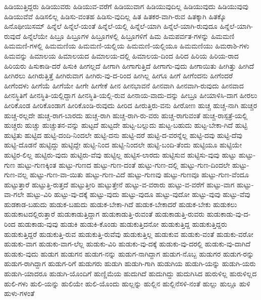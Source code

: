 {ಹಿಡಿಯುತ್ತಿದ್ದರು
ಹಿಡಿಯುವರು
ಹಿಡಿಯುವ-ವರೆಗೆ
ಹಿಡಿಯುವಾಗ
ಹಿಡಿಯುವುದಿಲ್ಲ
ಹಿಡಿಯುವುದು
ಹಿಡಿಯುವುವು
ಹಿಡಿಯುವೆವೆ
ಹಿಡಿಸಲಿಲ್ಲ
ಹಿಡಿಸು-ವಂತಹ
ಹಿಡಿಸು-ವುದಿಲ್ಲ
ಹಿತ
ಹಿತಕರ-ವಾಗಿ-ರುವ
ಹಿತಕ್ಕಾಗಿ
ಹಿತಕ್ಕೊ
ಹಿನೊಥೀಯಿಸಮ್
ಹಿನ್ನೆಲೆ
ಹಿನ್ನೆಲೆ-ಯಂತೆ
ಹಿನ್ನೆಲೆ-ಯಲ್ಲಿ
ಹಿನ್ನೆಲೆ-ಯಾಗಿ
ಹಿನ್ನೆಲೆ-ಯಾಗಿ-ರುವುದೂ
ಹಿನ್ನೆಲೆ-ಯಾಗಿ-ರುವುದೆ
ಹಿನ್ನೆಲೆಯೇ
ಹಿಬ್ರೂ
ಹಿಬ್ರೂಗಳ
ಹಿಬ್ರೂಗಳಲ್ಲಿ
ಹಿಬ್ರೂಗಳಿಗೆ
ಹಿಮ
ಹಿಮಪರ್ವತ-ಗಳನ್ನು
ಹಿಮಮಣಿ
ಹಿಮಮಣಿ-ಗಳಲ್ಲಿ
ಹಿಮಮಣಿಯ
ಹಿಮಮಣಿ-ಯಲ್ಲಿಯ
ಹಿಮಮಣಿ-ಯಲ್ಲಿಯೂ
ಹಿಮಮಣಿಯು
ಹಿಮರಾಶಿ-ಗಳು
ಹಿಮವನ್ನು
ಹಿಮಾಲಯ
ಹಿಮಾಲಯದ
ಹಿಮಾಲಯ-ದಲ್ಲಿ
ಹಿಮಾಲಯ-ದಿಂದ
ಹಿರಿದ
ಹಿರಿಯ
ಹಿರಿಯ-ರಾದ
ಹಿರಿಯರು
ಹಿಸುಕಾಡಿ-ದರೆ
ಹಿಸುಕಿ
ಹೀಗಲ್ಲದೆ
ಹೀಗಾಗಿ
ಹೀಗಾಗುತ್ತಿದೆ
ಹೀಗಾಗು-ವುದು
ಹೀಗಾಯಿತು
ಹೀಗಿತ್ತು
ಹೀಗಿದೆ
ಹೀಗಿರಲು
ಹೀಗಿರುತ್ತಿತ್ತೆ
ಹೀಗಿರುವಾಗ
ಹೀಗಿರು-ವು-ದ-ರಿಂದ
ಹೀಗಿಲ್ಲ
ಹೀಗೂ
ಹೀಗೆ
ಹೀಗೆಂದನು
ಹೀಗೆಂದರೆ
ಹೀಗೆಂದಳು
ಹೀಗೆಯೆ
ಹೀಗೆಯೇ
ಹೀಗೇ
ಹೀಗೇಕೆ
ಹೀನ
ಹೀನಭಾವನೆ
ಹೀನವಾಗಿ
ಹೀನವಾಗಿ-ರುವುದು
ಹೀನವಾದ
ಹೀನಸ್ಥಿತಿಗೆ
ಹೀನಸ್ಥಿತಿ-ಯಲ್ಲಿದ್ದಾಗ
ಹೀನಸ್ಥಿತಿ-ಯಲ್ಲಿ-ರುವ
ಹೀನಾಯ-ವಾದು-ದನ್ನು
ಹೀಬ್ರೂ
ಹೀಯಾಳಿಸಿ-ದಾಗ
ಹೀರಲು
ಹೀರಿಕೊಂಡ
ಹೀರಿಕೊಂಡಾಗ
ಹೀರಿಕೊಂಡಿ-ರುವುದು
ಹೀರಿದ
ಹೀರುತ್ತಿರು-ವನು
ಹೀರೋಣ
ಹುಚ್ಚ
ಹುಚ್ಚ-ನಾಗಿ
ಹುಚ್ಚರ
ಹುಚ್ಚ-ರಲ್ಲದೇ
ಹುಚ್ಚ-ರಾಗ-ಬಾರದು
ಹುಚ್ಚ-ರಾಗಿ
ಹುಚ್ಚ-ರಾಗಿ-ರು-ವರು
ಹುಚ್ಚ-ರಾಗುವಂತೆ
ಹುಚ್ಚ-ರಾಸ್ಪತ್ರೆ-ಯಲ್ಲಿ
ಹುಚ್ಚರು
ಹುಚ್ಚು
ಹುಚ್ಚುತನ-ವನ್ನು
ಹುಟ್ಟದೆ
ಹುಟ್ಟದೇ
ಹುಟ್ಟ-ಬಲ್ಲುದು
ಹುಟ್ಟ-ಬಹುದು
ಹುಟ್ಟ-ಬೇಕಾ-ಗಿದೆ
ಹುಟ್ಟಿ
ಹುಟ್ಟಿತು
ಹುಟ್ಟಿದ
ಹುಟ್ಟಿ-ದಂದಿ-ನಿಂದಲೇ
ಹುಟ್ಟಿ-ದನು
ಹುಟ್ಟಿ-ದರೆ
ಹುಟ್ಟಿ-ದ-ವರನ್ನೆಲ್ಲ
ಹುಟ್ಟಿ-ದವು
ಹುಟ್ಟಿ-ದೆವು
ಹುಟ್ಟಿ-ದೊಡನೆ
ಹುಟ್ಟಿದ್ದು
ಹುಟ್ಟಿದ್ದೇ
ಹುಟ್ಟಿ-ನಿಂದ
ಹುಟ್ಟಿ-ನಿಂದಲೇ
ಹುಟ್ಟಿ-ಬಂದಿ-ತೆಂದು
ಹುಟ್ಟಿಯೂ
ಹುಟ್ಟಿಯೇ
ಹುಟ್ಟಿರ-ಲಿಲ್ಲ
ಹುಟ್ಟಿರು-ವುದು
ಹುಟ್ಟಿರು-ವೆವು
ಹುಟ್ಟಿಲ್ಲ
ಹುಟ್ಟಿಸ-ಲಾರದು
ಹುಟ್ಟಿಸುವ
ಹುಟ್ಟಿಸು-ವುವು
ಹುಟ್ಟು
ಹುಟ್ಟು-ಗುಣ
ಹುಟ್ಟು-ಗುಣಕ್ಕಿಂತ
ಹುಟ್ಟು-ಗುಣದ
ಹುಟ್ಟು-ಗುಣ-ದಂತೆ
ಹುಟ್ಟು-ಗುಣ-ದಲ್ಲಿ
ಹುಟ್ಟು-ಗುಣ-ದಿಂದಲೇ
ಹುಟ್ಟು-ಗುಣ-ವಲ್ಲ
ಹುಟ್ಟು-ಗುಣ-ವಾ-ಯಿತು
ಹುಟ್ಟು-ಗುಣ-ವಿದೆ
ಹುಟ್ಟು-ಗುಣವು
ಹುಟ್ಟು-ಗುಣವೂ
ಹುಟ್ಟು-ಗುಣ-ವೆಂದೂ
ಹುಟ್ಟುತ್ತಾರೆ
ಹುಟ್ಟುತ್ತಿ-ರುತ್ತದೆ
ಹುಟ್ಟುತ್ತೀರಿ
ಹುಟ್ಟುತ್ತೇನೆ
ಹುಟ್ಟು-ವ-ವರಾರು
ಹುಟ್ಟು-ವ-ವರೆಗೆ
ಹುಟ್ಟು-ವಾಗ
ಹುಟ್ಟು-ವಾ-ಗಲೇ
ಹುಟ್ಟು-ವಿರಿ
ಹುಟ್ಟು-ವು-ದಕ್ಕೆ
ಹುಟ್ಟು-ವುದು
ಹುಟ್ಟು-ವುದೂ
ಹುಟ್ಟು-ವುದೋ
ಹುಟ್ಟು-ವುವು
ಹುಟ್ಟು-ವೆವು
ಹುಡಕಾಡ-ಬಹುದು
ಹುಡುಕ-ಬಹುದು
ಹುಡುಕ-ಬೇಕಾ-ಗಿದೆ
ಹುಡುಕ-ಬೇಕಾದರೆ
ಹುಡುಕ-ಬೇಕು
ಹುಡುಕಲು
ಹುಡುಕಾಟದಲ್ಲಿರುತ್ತಾರೆ
ಹುಡುಕಾಡುತ್ತಿದ್ದಾಗ
ಹುಡುಕಾಡುತ್ತಿ-ರುವಂತೆ
ಹುಡುಕಾಡುತ್ತಿ-ರುವರು
ಹುಡುಕಾಡು-ವು-ದ-ರಿಂದ
ಹುಡುಕಾಡು-ವುವು
ಹುಡುಕಿ
ಹುಡುಕಿ-ಕೊಂಡು
ಹುಡುಕುತ್ತಿದನೋ
ಹುಡುಕುತ್ತಿದ್ದ
ಹುಡುಕುತ್ತಿದ್ದರು
ಹುಡುಕುತ್ತಿದ್ದರೆ
ಹುಡುಕುತ್ತಿ-ರುವ
ಹುಡುಕುತ್ತಿ-ರುವೆವು
ಹುಡುಕುತ್ತಿಲ್ಲ
ಹುಡುಕುವ
ಹುಡುಕು-ವಂತೆ
ಹುಡುಕು-ವರೋ
ಹುಡುಕು-ವಾಗ
ಹುಡುಕು-ವಾಗ-ಲೆಲ್ಲ
ಹುಡುಕು-ವಿರಿ
ಹುಡುಕು-ವು-ದಕ್ಕೆ
ಹುಡುಕು-ವು-ದರಲ್ಲಿ
ಹುಡುಕು-ವು-ದಾಗಿದೆ
ಹುಡುಕು-ವುದು
ಹುಡುಗ
ಹುಡುಗನ
ಹುಡುಗ-ನನ್ನು
ಹುಡುಗ-ನಾಗಿದ್ದಾಗ
ಹುಡುಗ-ನೊಬ್ಬ
ಹುಡುಗರ
ಹುಡುಗ-ರನ್ನು
ಹುಡುಗ-ರಾಗಿದ್ದಾಗ
ಹುಡುಗ-ರಿಗೆ
ಹುಡುಗರು
ಹುಡುಗಿ
ಹುಡುಗಿ-ಗಾಗಿ
ಹುಡುಗಿಯ
ಹುಡುಗಿ-ಯನ್ನು
ಹುಡುಗಿ-ಯರು
ಹುಡುಗಿ-ಯಾದರೂ
ಹುಡುಗಿ-ಯೊಂದಿಗೆ
ಹುಣ್ಣಿಮೆಯ
ಹುದುಗಿದೆ
ಹುದುಗಿದ್ದು
ಹುದುಗಿಸಿದ
ಹುರುಳಿಲ್ಲ
ಹುರುಳಿಲ್ಲದ
ಹುಲಿ-ಗಳು
ಹುಲಿ-ಯನ್ನು
ಹುಲಿಯೇ
ಹುಲಿ-ಯೊಂದು
ಹುಲ್ಲನ್ನು
ಹುಲ್ಲಿನ
ಹುಲ್ಲಿನೆಸಳಿ-ನಂತೆ
ಹುಲ್ಲು
ಹುಲ್ಲೂ
ಹುಳಿ
ಹುಳು-ಗಳಂತೆ
}
